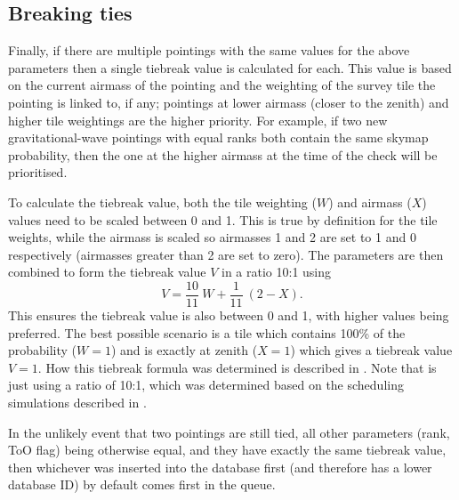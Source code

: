 \subsection{Breaking ties}
\label{sec:breaking_ties}
\begin{colsection}

Finally, if there are multiple pointings with the same values for the above parameters then a single tiebreak value is calculated for each. This value is based on the current airmass of the pointing and the weighting of the survey tile the pointing is linked to, if any; pointings at lower airmass (closer to the zenith) and higher tile weightings are the higher priority. For example, if two new gravitational-wave pointings with equal ranks both contain the same skymap probability, then the one at the higher airmass at the time of the check will be prioritised.

\newpage

To calculate the tiebreak value, both the tile weighting ($W$) and airmass ($X$) values need to be scaled between 0 and 1. This is true by definition for the tile weights, while the airmass is scaled so airmasses 1 and 2 are set to 1 and 0 respectively (airmasses greater than 2 are set to zero). The parameters are then combined to form the tiebreak value $V$ in a ratio 10:1 using
%
\begin{equation}
    V = \frac{10}{11}~W + \frac{1}{11}~(2 - X).
    \label{eq:tiebreak}
\end{equation}
%
This ensures the tiebreak value is also between 0 and 1, with higher values being preferred. The best possible scenario is a tile which contains 100\% of the probability ($W=1$) and is exactly at zenith ($X=1$) which gives a tiebreak value $V=1$. How this tiebreak formula was determined is described in . Note that  is just  using a ratio of 10:1, which was determined based on the scheduling simulations described in .

In the unlikely event that two pointings are still tied, all other parameters (rank, ToO flag) being otherwise equal, and they have exactly the same tiebreak value, then whichever was inserted into the database first (and therefore has a lower database ID) by default comes first in the queue.

\end{colsection}


